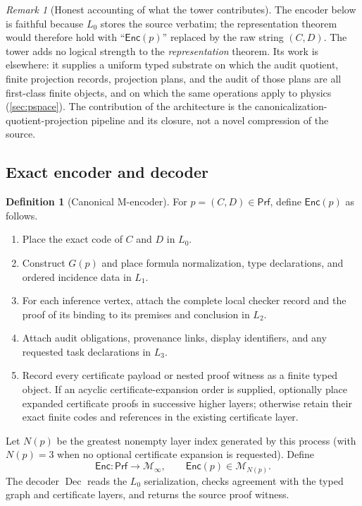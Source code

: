 \documentclass[11pt]{article}
\newcommand{\Dec}{\ensuremath{\operatorname{Dec}}}
\newcommand{\Prf}{\mathsf{Prf}}
\newcommand{\M}{\mathcal M}
\newcommand{\Enc}{\mathsf{Enc}}
\theoremstyle{plain}
\theoremstyle{definition}
\newtheorem{definition}[theorem]{Definition}
\theoremstyle{remark}
\newtheorem{remark}[theorem]{Remark}
\begin{document}
\begin{remark}[Honest accounting of what the tower contributes]
\label{rem:tower-honest}
The encoder below is faithful because $L_0$ stores the source verbatim; the representation theorem would therefore hold with ``$\Enc(p)$'' replaced by the raw string $(C,D)$.  The tower adds no logical strength to the \emph{representation} theorem.  Its work is elsewhere: it supplies a uniform typed substrate on which the audit quotient, finite
projection records, projection plans, and the audit of those plans are all
first-class finite objects, and on which the same operations apply to physics
(\cref{sec:pspace}).  The contribution of the architecture is the canonicalization-quotient-projection pipeline and its closure, not a novel compression of the source.
\end{remark}

\subsection{Exact encoder and decoder}

\begin{definition}[Canonical M-encoder]
\label{def:encoder}
For $p=(C,D)\in\Prf$, define $\Enc(p)$ as follows.
\begin{enumerate}
    \item Place the exact code of $C$ and $D$ in $L_0$.
    \item Construct $G(p)$ and place formula normalization, type declarations, and ordered incidence data in $L_1$.
    \item For each inference vertex, attach the complete local checker record and the proof of its binding to its premises and conclusion in $L_2$.
    \item Attach audit obligations, provenance links, display identifiers, and any requested task declarations in $L_3$.
    \item Record every certificate payload or nested proof witness as a finite typed object.  If an acyclic certificate-expansion order is supplied, optionally place expanded certificate proofs in successive higher layers; otherwise retain their exact finite codes and references in the existing certificate layer.
\end{enumerate}
Let $N(p)$ be the greatest nonempty layer index generated by this process (with $N(p)=3$ when no optional certificate expansion is requested).  Define
\[
  \Enc:\Prf\to\M_\infty,\qquad \Enc(p)\in\M_{N(p)}.
\]
The decoder $\Dec$ reads the $L_0$ serialization, checks agreement with the typed graph and certificate layers, and returns the source proof witness.
\end{definition}
\end{document}
